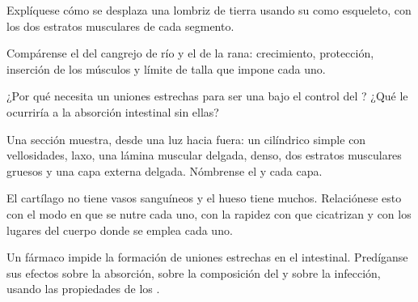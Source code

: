 \begin{exercise}[$\star\star$]\label{exo:b1:body-plans-tissues:6}
Explíquese cómo se desplaza una lombriz de tierra usando su  como
esqueleto, con los dos estratos musculares de cada segmento.
\end{exercise}

\begin{exercise}[$\star\star$]\label{exo:b1:body-plans-tissues:7}
Compárense el  del cangrejo de río y el  de la
rana: crecimiento, protección, inserción de los músculos y límite de talla
que impone cada uno.
\end{exercise}

\begin{exercise}[$\star\star$]\label{exo:b1:body-plans-tissues:8}
¿Por qué necesita un  uniones estrechas para ser una  bajo el control del ? ¿Qué le ocurriría a la absorción
intestinal sin ellas?
\end{exercise}

\begin{exercise}[$\star\star$]\label{exo:b1:body-plans-tissues:9}
Una sección muestra, desde una luz hacia fuera: un  cilíndrico
simple con vellosidades,  laxo, una lámina muscular
delgada,  denso, dos estratos musculares gruesos y una capa
externa delgada. Nómbrense el  y cada capa.
\end{exercise}

\begin{exercise}[$\star\star\star$]\label{exo:b1:body-plans-tissues:10}
El cartílago no tiene vasos sanguíneos y el hueso tiene muchos.
Relaciónese esto con el modo en que se nutre cada uno, con la rapidez con
que cicatrizan y con los lugares del cuerpo donde se emplea cada uno.
\end{exercise}

\begin{exercise}[$\star\star\star$]\label{exo:b1:body-plans-tissues:11}
Un fármaco impide la formación de uniones estrechas en el 
intestinal. Predíganse sus efectos sobre la absorción, sobre la composición
del  y sobre la infección, usando las propiedades de los
.
\end{exercise}


